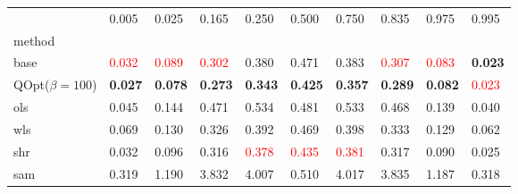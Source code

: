 \begin{tabular}{llllllllll}
\toprule
 & 0.005 & 0.025 & 0.165 & 0.250 & 0.500 & 0.750 & 0.835 & 0.975 & 0.995 \\
method &  &  &  &  &  &  &  &  &  \\
\midrule
base & \textcolor{red}{0.032} & \textcolor{red}{0.089} & \textcolor{red}{0.302} & 0.380 & 0.471 & 0.383 & \textcolor{red}{0.307} & \textcolor{red}{0.083} & \textbf{0.023} \\
\midrule
QOpt($\beta=100$) & \textbf{0.027} & \textbf{0.078} & \textbf{0.273} & \textbf{0.343} & \textbf{0.425} & \textbf{0.357} & \textbf{0.289} & \textbf{0.082} & \textcolor{red}{0.023} \\
ols & 0.045 & 0.144 & 0.471 & 0.534 & 0.481 & 0.533 & 0.468 & 0.139 & 0.040 \\
wls & 0.069 & 0.130 & 0.326 & 0.392 & 0.469 & 0.398 & 0.333 & 0.129 & 0.062 \\
shr & 0.032 & 0.096 & 0.316 & \textcolor{red}{0.378} & \textcolor{red}{0.435} & \textcolor{red}{0.381} & 0.317 & 0.090 & 0.025 \\
sam & 0.319 & 1.190 & 3.832 & 4.007 & 0.510 & 4.017 & 3.835 & 1.187 & 0.318 \\
\bottomrule
\end{tabular}